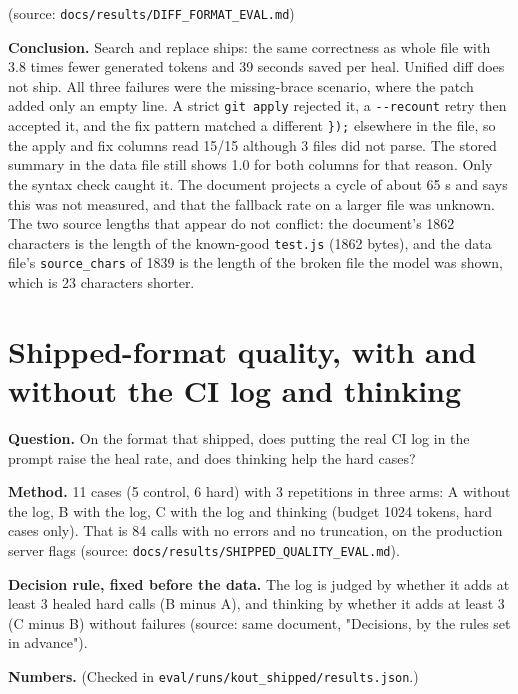 \documentclass[11pt,a4paper]{report}
\begin{document}
(source: \texttt{docs/\allowbreak{}results/\allowbreak{}DIFF\_\allowbreak{}FORMAT\_\allowbreak{}EVAL.\allowbreak{}md})

\textbf{Conclusion.} Search and replace ships: the same correctness as whole file with 3.8 times fewer generated tokens and 39 seconds saved per heal. Unified diff does not ship. All three failures were the missing-brace scenario, where the patch added only an empty line. A strict \texttt{git apply} rejected it, a \texttt{-\allowbreak{}-\allowbreak{}recount} retry then accepted it, and the fix pattern matched a different \texttt{\});} elsewhere in the file, so the apply and fix columns read 15/15 although 3 files did not parse. The stored summary in the data file still shows 1.0 for both columns for that reason. Only the syntax check caught it. The document projects a cycle of about 65 s and says this was not measured, and that the fallback rate on a larger file was unknown. The two source lengths that appear do not conflict: the document's 1862 characters is the length of the known-good \texttt{test.\allowbreak{}js} (1862 bytes), and the data file's \texttt{source\_\allowbreak{}chars} of 1839 is the length of the broken file the model was shown, which is 23 characters shorter.

\section{Shipped-format quality, with and without the CI log and thinking}

\textbf{Question.} On the format that shipped, does putting the real CI log in the prompt raise the heal rate, and does thinking help the hard cases?

\textbf{Method.} 11 cases (5 control, 6 hard) with 3 repetitions in three arms: A without the log, B with the log, C with the log and thinking (budget 1024 tokens, hard cases only). That is 84 calls with no errors and no truncation, on the production server flags (source: \texttt{docs/\allowbreak{}results/\allowbreak{}SHIPPED\_\allowbreak{}QUALITY\_\allowbreak{}EVAL.\allowbreak{}md}).

\textbf{Decision rule, fixed before the data.} The log is judged by whether it adds at least 3 healed hard calls (B minus A), and thinking by whether it adds at least 3 (C minus B) without failures (source: same document, "Decisions, by the rules set in advance").

\textbf{Numbers.} (Checked in \texttt{eval/\allowbreak{}runs/\allowbreak{}kout\_\allowbreak{}shipped/\allowbreak{}results.\allowbreak{}json}.)
\end{document}
